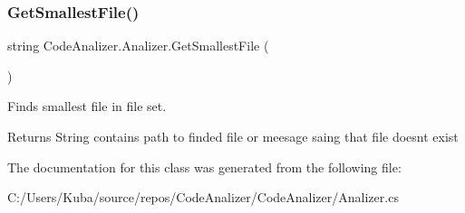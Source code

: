 \subsubsection{\texorpdfstring{Get\+Smallest\+File()}{GetSmallestFile()}}
{\footnotesize\ttfamily string Code\+Analizer.\+Analizer.\+Get\+Smallest\+File (\begin{DoxyParamCaption}{ }\end{DoxyParamCaption})}



Finds smallest file in file set. 

\begin{DoxyReturn}{Returns}
String contains path to finded file or meesage saing that file doesnt exist
\end{DoxyReturn}


The documentation for this class was generated from the following file\+:\begin{DoxyCompactItemize}
\item 
C\+:/\+Users/\+Kuba/source/repos/\+Code\+Analizer/\+Code\+Analizer/Analizer.\+cs\end{DoxyCompactItemize}
